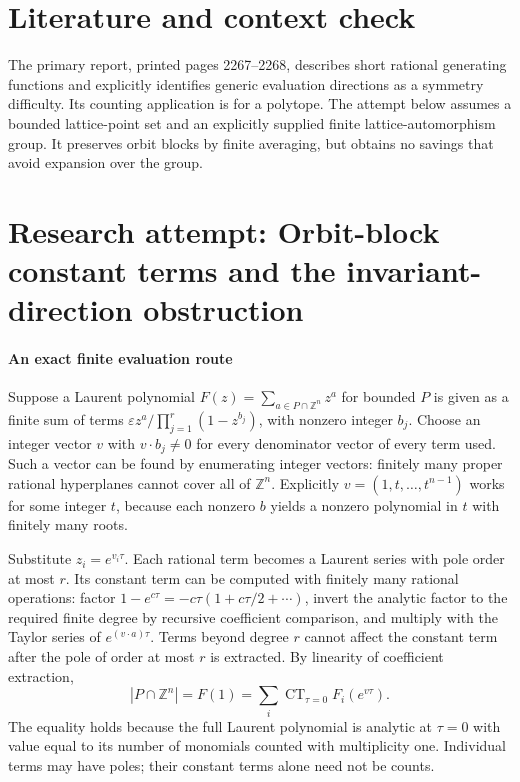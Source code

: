 \documentclass[11pt]{article}
\begin{document}
\section{Literature and context check}
The primary report, printed pages 2267--2268, describes short rational generating functions and explicitly identifies generic evaluation directions as a symmetry difficulty. Its counting application is for a polytope. The attempt below assumes a bounded lattice-point set and an explicitly supplied finite lattice-automorphism group. It preserves orbit blocks by finite averaging, but obtains no savings that avoid expansion over the group.
\section{Research attempt: Orbit-block constant terms and the invariant-direction obstruction}

\paragraph{An exact finite evaluation route}
Suppose a Laurent polynomial $F(z)=\sum_{a\in P\cap\mathbb Z^n}z^a$ for bounded $P$ is given as a finite sum of terms $\varepsilon z^a/\prod_{j=1}^r(1-z^{b_j})$, with nonzero integer $b_j$. Choose an integer vector $v$ with $v\cdot b_j\ne0$ for every denominator vector of every term used. Such a vector can be found by enumerating integer vectors: finitely many proper rational hyperplanes cannot cover all of $\mathbb Z^n$. Explicitly $v=(1,t,\ldots,t^{n-1})$ works for some integer $t$, because each nonzero $b$ yields a nonzero polynomial in $t$ with finitely many roots.

Substitute $z_i=e^{v_i\tau}$. Each rational term becomes a Laurent series with pole order at most $r$. Its constant term can be computed with finitely many rational operations: factor $1-e^{c\tau}=-c\tau(1+c\tau/2+\cdots)$, invert the analytic factor to the required finite degree by recursive coefficient comparison, and multiply with the Taylor series of $e^{(v\cdot a)\tau}$. Terms beyond degree $r$ cannot affect the constant term after the pole of order at most $r$ is extracted. By linearity of coefficient extraction,
\[
 |P\cap\mathbb Z^n|=F(1)=\sum_i\operatorname{CT}_{\tau=0}F_i(e^{v\tau}).
 \tag{1}
\]
The equality holds because the full Laurent polynomial is analytic at $\tau=0$ with value equal to its number of monomials counted with multiplicity one. Individual terms may have poles; their constant terms alone need not be counts.
\end{document}

